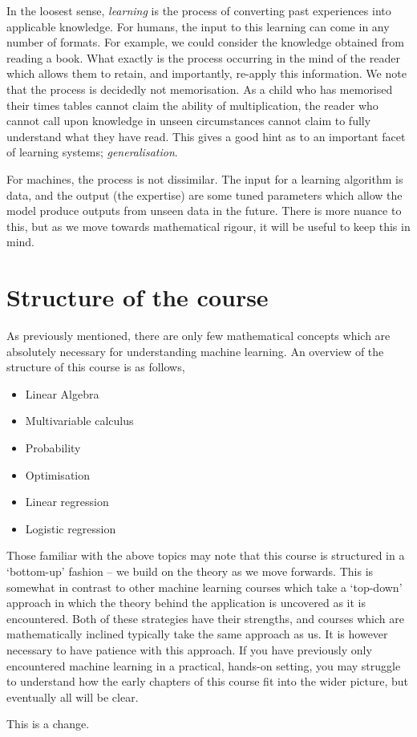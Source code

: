 In the loosest sense, \textit{learning} is the process of converting past experiences into applicable knowledge. For humans, the input to this learning can come in any number of formats. For example, we could consider the knowledge obtained from reading a book. What exactly is the process occurring in the mind of the reader which allows them to retain, and importantly, re-apply this information. We note that the process is decidedly not memorisation. As a child who has memorised their times tables cannot claim the ability of multiplication, the reader who cannot call upon knowledge in unseen circumstances cannot claim to fully understand what they have read. This gives a good hint as to an important facet of learning systems; \textit{generalisation}.

For machines, the process is not dissimilar. The input for a learning algorithm is data, and the output (the expertise) are some tuned parameters which allow the model produce outputs from unseen data in the future. There is more nuance to this, but as we move towards mathematical rigour, it will be useful to keep this in mind.

\section{Structure of the course}
As previously mentioned, there are only few mathematical concepts which are absolutely necessary for understanding machine learning. An overview of the structure of this course is as follows,

\begin{itemize}
	\item Linear Algebra
	\item Multivariable calculus
	\item Probability
	\item Optimisation
	\item Linear regression
	\item Logistic regression
\end{itemize}

Those familiar with the above topics may note that this course is structured in a `bottom-up' fashion -- we build on the theory as we move forwards. This is somewhat in contrast to other machine learning courses which take a `top-down' approach in which the theory behind the application is uncovered as it is encountered. Both of these strategies have their strengths, and courses which are mathematically inclined typically take the same approach as us. It is however necessary to have patience with this approach. If you have previously only encountered machine learning in a practical, hands-on setting, you may struggle to understand how the early chapters of this course fit into the wider picture, but eventually all will be clear.

This is a change.

